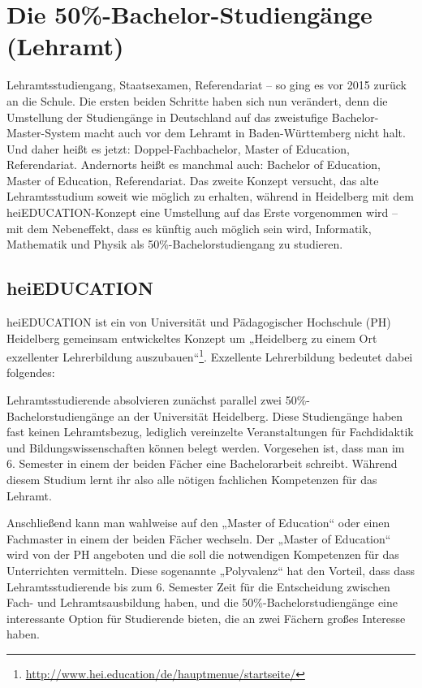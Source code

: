 \section{Die 50\%-Bachelor-Studiengänge (Lehramt)} %
\label{lehramt_allg}

Lehramtsstudiengang, Staatsexamen, Referendariat -- so ging es vor 2015 zurück
an die Schule.  Die ersten beiden Schritte haben sich nun verändert, denn die
Umstellung der Studiengänge in Deutschland auf das zweistufige
Bachelor-Master-System macht auch vor dem Lehramt in Baden-Württemberg nicht
halt. Und daher heißt es jetzt: Doppel-Fachbachelor, Master of Education,
Referendariat. Andernorts heißt es manchmal auch: Bachelor of Education, Master
of Education, Referendariat. Das zweite Konzept versucht, das alte
Lehramtsstudium soweit wie möglich zu erhalten, während in Heidelberg mit dem
heiEDUCATION-Konzept eine Umstellung auf das Erste vorgenommen wird -- mit dem
Nebeneffekt, dass es künftig auch möglich sein wird, Informatik, Mathematik und
Physik als 50\%-Bachelorstudiengang zu studieren.

\subsection{heiEDUCATION}

heiEDUCATION ist ein von Universität und Pädagogischer Hochschule (PH)
Heidelberg gemeinsam entwickeltes Konzept um „Heidelberg zu einem Ort
exzellenter Lehrerbildung
auszubauen“\footnote{\url{http://www.hei.education/de/hauptmenue/startseite/}}.
Exzellente Lehrerbildung bedeutet dabei folgendes:

Lehramtsstudierende absolvieren zunächst parallel zwei
50\%-Bachelorstudiengänge an der Universität Heidelberg. Diese Studiengänge
haben fast keinen Lehramtsbezug, lediglich vereinzelte Veranstaltungen für
Fachdidaktik und Bildungswissenschaften können belegt werden. Vorgesehen ist,
dass man im 6. Semester in einem der beiden Fächer eine Bachelorarbeit
schreibt. Während diesem Studium lernt ihr also alle nötigen fachlichen
Kompetenzen für das Lehramt.

Anschließend kann man wahlweise auf den „Master of Education“ oder einen
Fachmaster in einem der beiden Fächer wechseln. Der „Master of Education“ wird
von der PH angeboten und die soll die notwendigen Kompetenzen für das
Unterrichten vermitteln.  Diese sogenannte „Polyvalenz“ hat den Vorteil, dass
dass Lehramtsstudierende bis zum 6. Semester Zeit für die Entscheidung zwischen
Fach- und Lehramtsausbildung haben, und die 50\%-Bachelorstudiengänge eine
interessante Option für Studierende bieten, die an zwei Fächern großes
Interesse haben.

